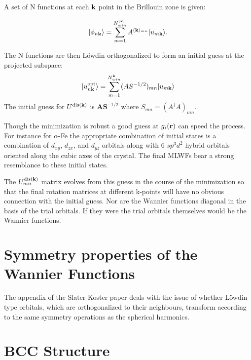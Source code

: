 A set of N functions at each ${\bf k}$ point in the Brillouin zone is given:

\begin{equation}
|\phi_{n{\bf k}} \rangle = \sum_{m=1}^{N^{({\bf k})}_{win}} A^{({\bf k})_{mn}} |u_{m{\bf k}}\rangle.
\end{equation}

The N functions are then L\"owdin orthogonalized to form an 
initial guess at the projected subspace:
%
\begin{equation}
|u^{\rm opt}_{n{\bf k}} \rangle = \sum_{m=1}^{N^{{\bf k}}_{win}}(AS^{-1/2})_{mn}|u_{m{\bf k}}\rangle
\end{equation}
%
The initial guess for $U^{\rm dis ({\bf k})}$ is $\mathbf{A}\mathbf{S}^{-1/2}$ 
where $S_{mn}=(A^{\dagger}A)_{mn}$.

Though the minimization is robust a good guess at $g_{i}({\bf r})$ can speed the process.
For instance for $\alpha$-Fe the appropriate combination of initial states is a combination of 
$d_{xy}$, $d_{zx}$, and $d_{yz}$ orbitals along with 6 $sp^{3}d^{2}$ hybrid orbitals oriented along the 
cubic axes of the crystal. The final MLWFs bear a strong resemblance to these initial states.

The $U^{{\rm dis}({\bf k})}_{mn}$ matrix evolves from this guess in the course of the 
minimization so that the final rotation matrices at different k-points will have no 
obvious connection with the initial guess. Nor are the Wannier functions diagonal in the basis 
of the trial orbitals. If they were the trial orbitals themselves would be the Wannier functions. 

\section{Symmetry properties of the Wannier Functions}
The appendix of the Slater-Koster paper deals with the issue of whether L\"owdin type
orbitals, which are orthogonalized to their neighbours, transform according to the same
symmetry operations as the spherical harmonics.

\section{BCC Structure}

